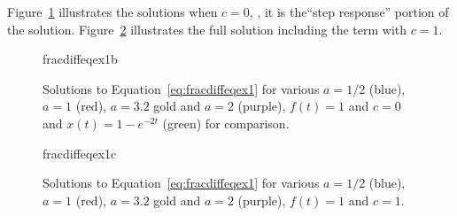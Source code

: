 \begin{example}
Figure~\ref{fig:fracdiffeqex1b} illustrates the solutions when $c=0$, \ie, it is the``step response'' portion of the solution. Figure~\ref{fig:fracdiffeqex1c} illustrates the full solution including the term with $c=1$.

\begin{figure}
  \centering
  {fracdiffeqex1b}
  \caption{Solutions to Equation~\ref{eq:fracdiffeqex1} for various $a = 1/2$ (blue), $a=1$ (red), $a=3.2$ gold and $a=2$ (purple), $f(t)=1$ and $c=0$  and $x(t) = 1 - e^{-2 t}$ (green) for comparison.}
  \label{fig:fracdiffeqex1b}
\end{figure}

\begin{figure}
  \centering
  {fracdiffeqex1c}
\caption{Solutions to Equation~\ref{eq:fracdiffeqex1} for various $a = 1/2$ (blue), $a=1$ (red), $a=3.2$ gold and $a=2$ (purple), $f(t)=1$ and $c=1$.}
  \label{fig:fracdiffeqex1c}
\end{figure}


\end{example}
